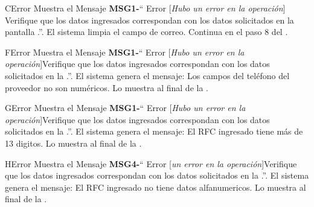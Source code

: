\begin{UCtrayectoriaA}{C}{Error}
			\UCpaso Muestra el Mensaje {\bf MSG1-}`` Error [{\em Hubo un error en la operación}] Verifique que los datos ingresados correspondan con los datos solicitados en la pantalla .''.
			\UCpaso El sistema limpia el campo de correo.
			\UCpaso Continua en el paso 8 del .
		\end{UCtrayectoriaA}

%

\begin{UCtrayectoriaA}{F}{Error}
			\UCpaso Muestra el Mensaje {\bf MSG1-}`` Error [{\em Hubo un error en la operación}]Verifique que los datos ingresados correspondan con los datos solicitados en la  .''.
			\UCpaso El sistema genera el mensaje: Los campos del teléfono del proveedor no son numéricos.
			\UCpaso Lo muestra al final de la  .
		\end{UCtrayectoriaA}

\begin{UCtrayectoriaA}{G}{Error}
			\UCpaso Muestra el Mensaje {\bf MSG1-}`` Error [{\em Hubo un error en la operación}]Verifique que los datos ingresados correspondan con los datos solicitados en la  .''.
			\UCpaso El sistema genera el mensaje: El RFC ingresado tiene más de 13 digitos.
			\UCpaso Lo muestra al final de la  .
		\end{UCtrayectoriaA}

\begin{UCtrayectoriaA}{H}{Error}
			\UCpaso Muestra el Mensaje {\bf MSG4-}`` Error [{\em  un error en la operación}]Verifique que los datos ingresados correspondan con los datos solicitados en la  .''.
			\UCpaso El sistema genera el mensaje: El RFC ingresado no tiene datos alfanumericos.
			\UCpaso Lo muestra al final de la  .
		\end{UCtrayectoriaA}
